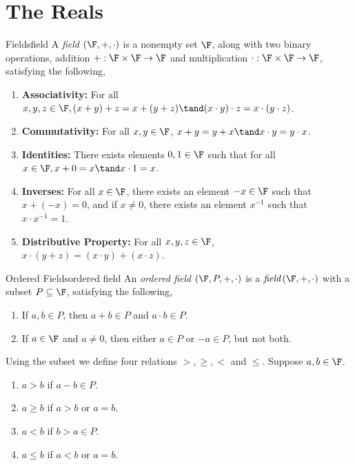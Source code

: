 \documentclass{report}
\begin{document}
\chapter{The Reals}

\begin{definition}{Fields}{field}
  A \emph{field} $\left(\F, +, \cdot\right)$ is a nonempty set $\F$, along with two binary operations,
  addition $+: \F \times \F \rightarrow \F$
  and multiplication $\cdot: \F \times \F \rightarrow \F$, satisfying the following,

  \begin{enumerate}
    \item \textbf{Associativity:} For all $x, y, z \in \F, (x + y) + z = x + (y + z) \tand (x \cdot y) \cdot z = x \cdot (y \cdot z)$.
    \item \textbf{Commutativity:} For all $x, y \in \F$, $x + y = y + x \tand x \cdot y = y \cdot x$.
    \item \textbf{Identities:} There exists elements $0, 1 \in \F$ such that for all $x \in \F, x + 0 = x \tand x \cdot 1 = x$.
    \item \textbf{Inverses:} For all $x \in \F$, there exists an element $-x \in \F$ such that $x + (-x) = 0$, and if $x \neq 0$, there exists an element $x^{-1}$ such that $x \cdot x^{-1} = 1$.
    \item \textbf{Distributive Property:} For all $x, y, z \in \F$, $x \cdot (y + z) = (x \cdot y) + (x \cdot z)$.
  \end{enumerate}
\end{definition}

\begin{definition}{Ordered Fields}{ordered field}
  An \emph{ordered field} $\left(\F, P, +, \cdot\right)$ is a $\emph{field} \left(\F, +, \cdot \right)$ with a subset $P \subseteq \F$, satisfying the following,
  \begin{enumerate}
    \item If $a, b \in P$, then $a + b \in P$ and $a \cdot b \in P$.
    \item If $a \in \F$ and $a \neq 0$, then either $a \in P$ or $-a \in P$, but not both.
  \end{enumerate}
  Using the subset we define four relations $>, \geq, <$ and $\leq$.
  Suppose $a, b \in \F$.
  \begin{enumerate}
    \item $a > b$ if $a - b \in P$.
    \item $a \geq b$ if $a > b$ or $a = b$.
    \item $a < b$ if $b > a \in P$.
    \item $a \leq b$ if $a < b$ or $a = b$.
  \end{enumerate}
\end{definition}
\end{document}
